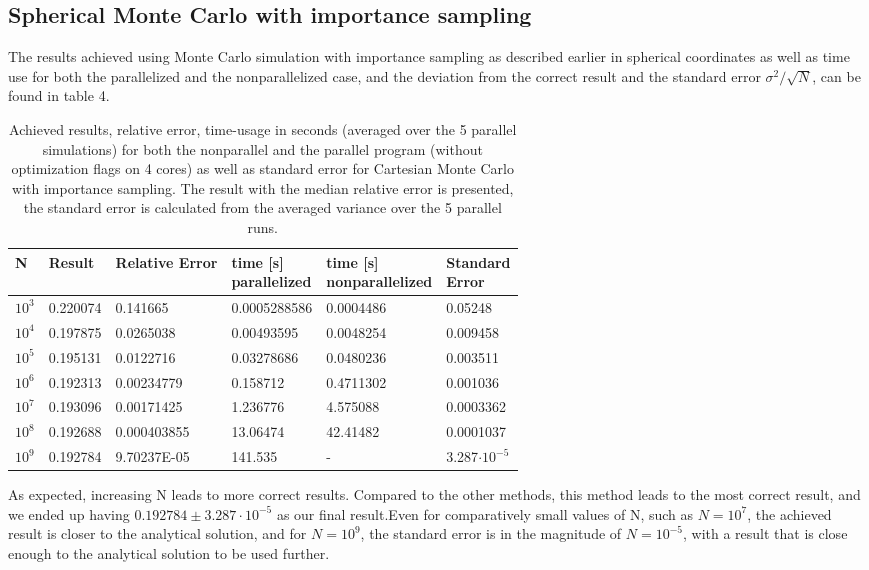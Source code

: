 \documentclass[10pt,a4paper]{article}
\begin{document}
\subsection{Spherical Monte Carlo with importance sampling}
The results achieved using Monte Carlo simulation with importance sampling as described earlier in spherical coordinates as well as time use for both the parallelized and the nonparallelized case, and the deviation from the correct result and the standard error $\sigma^2/\sqrt{N}$, can be found in table 4.

\begin{table}[H]
\caption[Spherical Monte Carlo with importance sampling]{Achieved results, relative error, time-usage in seconds (averaged over the 5 parallel simulations) for both the nonparallel and the parallel program (without optimization flags on 4 cores) as well as standard error for Cartesian Monte Carlo with importance sampling.  The result with the median relative error is presented, the standard error is calculated from the averaged variance over the 5 parallel runs.}
\begin{tabular}{|l|l|l|l|l|l|}
\hline
N          & Result   & Relative Error & \pbox{10cm}{time {[}s{]}\\ parallelized}  &  \pbox{10cm}{time {[}s{]}\\ nonparallelized} &  \pbox{10cm}{Standard\\ Error} \\ \hline
$10^3$       & 0.220074 & 0.141665    & 0.0005288586 & 0.0004486 & 0.05248   \\\hline
$10^4$      & 0.197875 & 0.0265038   & 0.00493595   & 0.0048254 & 0.009458  \\\hline
$10^5$     & 0.195131 & 0.0122716   & 0.03278686   & 0.0480236 & 0.003511  \\\hline
$10^6$    & 0.192313 & 0.00234779  & 0.158712     & 0.4711302 & 0.001036  \\\hline
$10^7$   & 0.193096 & 0.00171425  & 1.236776     & 4.575088  & 0.0003362 \\\hline
$10^8$  & 0.192688 & 0.000403855 & 13.06474     & 42.41482  & 0.0001037 \\\hline
$10^9$ & 0.192784 & 9.70237E-05 & 141.535      & -       & 3.287$\cdot10^{-5}$\\\hline
\end{tabular}
\end{table}

As expected, increasing N leads to more correct results. Compared to the other methods, this method leads to the most correct result, and we ended up having $0.192784\pm 3.287\cdot10^{-5}$ as our final result.Even for comparatively small values of N, such as $N=10^7$, the achieved result is closer to the analytical solution, and for  $N=10^9$, the standard error is in the magnitude of $N=10^{-5}$, with a result that is close enough to the analytical solution to be used further.
\end{document}
